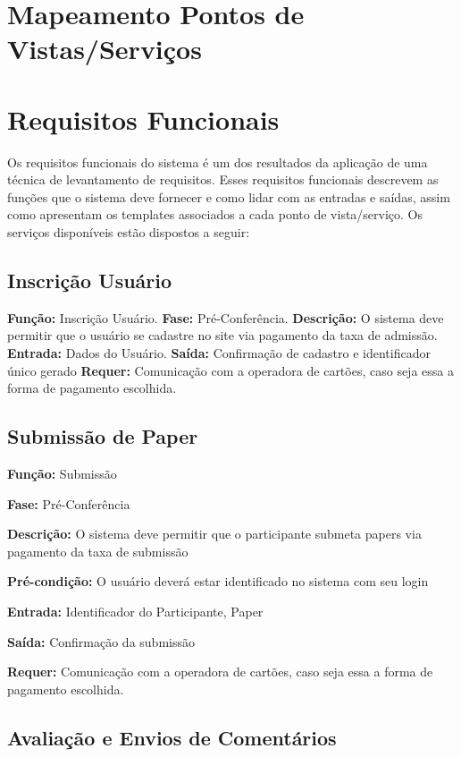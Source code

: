 \documentclass[letter]{article}
\begin{document}
\section{Mapeamento Pontos de Vistas/Serviços}
\section{Requisitos Funcionais}

Os requisitos funcionais do sistema é um dos resultados da aplicação de uma técnica de levantamento de requisitos. Esses requisitos funcionais descrevem as funções que o sistema deve fornecer e como lidar com as entradas e saídas, assim como apresentam os templates associados a cada ponto de vista/serviço. Os serviços disponíveis estão dispostos a seguir:

\subsection{Inscrição Usuário}

\textbf{Função:} Inscrição Usuário.
\textbf{Fase:} Pré-Conferência.
\textbf{Descrição:} O sistema deve permitir que o usuário se cadastre no site via pagamento da taxa de admissão.
\textbf{Entrada:} Dados do Usuário.
\textbf{Saída:} Confirmação de cadastro e identificador único gerado
\textbf{Requer:} Comunicação com a operadora de cartões, caso seja essa a
forma de pagamento escolhida.



\subsection{ Submissão de Paper}

\textbf{Função:} Submissão

\textbf{Fase:} Pré-Conferência

\textbf{Descrição:} O sistema deve permitir que o participante submeta papers via pagamento da taxa de submissão

\textbf{Pré-condição:} O usuário deverá estar identificado no sistema com seu login

\textbf{Entrada:} Identificador do Participante, Paper

\textbf{Saída:} Confirmação da submissão

\textbf{Requer:} Comunicação com a operadora de cartões, caso seja essa a forma de pagamento escolhida.

\subsection{ Avaliação e Envios de Comentários}
\end{document}
